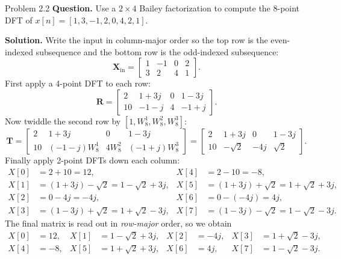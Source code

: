 \documentclass[10pt]{article}
\newcommand{\Prompt}[1]{\textbf{Question.} #1}
\newcommand{\SketchLabel}{\tcblower\textbf{Solution.}}
\begin{document}
\begin{examplebox}{Problem 2.2}
  \Prompt{Use a \(2\times 4\) Bailey factorization to compute the 8-point DFT of \(x[n]=[1,3,-1,2,0,4,2,1]\).}

  \medskip
  \SketchLabel{}
  Write the input in column-major order so the top row is the even-indexed subsequence and the bottom row is the odd-indexed subsequence:
  \[
    \mathbf{X}_{\text{in}}=
    \begin{bmatrix}
      1&-1&0&2\\
      3&2&4&1
    \end{bmatrix}.
  \]
  First apply a 4-point DFT to each row:
  \[
    \mathbf{R}=
    \begin{bmatrix}
      2&1+3j&0&1-3j\\
      10&-1-j&4&-1+j
    \end{bmatrix}.
  \]
  Now twiddle the second row by \([1,W_8^1,W_8^2,W_8^3]\):
  \[
    \mathbf{T}=
    \begin{bmatrix}
      2&1+3j&0&1-3j\\
      10&(-1-j)W_8^1&4W_8^2&(-1+j)W_8^3
    \end{bmatrix}
    =
    \begin{bmatrix}
      2&1+3j&0&1-3j\\
      10&-\sqrt2&-4j&\sqrt2
    \end{bmatrix}.
  \]
  Finally apply 2-point DFTs down each column:
  \[
    \begin{aligned}
      X[0]&=2+10=12, & X[4]&=2-10=-8,\\
      X[1]&=(1+3j)-\sqrt2=1-\sqrt2+3j, & X[5]&=(1+3j)+\sqrt2=1+\sqrt2+3j,\\
      X[2]&=0-4j=-4j, & X[6]&=0-(-4j)=4j,\\
      X[3]&=(1-3j)+\sqrt2=1+\sqrt2-3j, & X[7]&=(1-3j)-\sqrt2=1-\sqrt2-3j.
    \end{aligned}
  \]
  The final matrix is read out in \emph{row-major} order, so we obtain
  \[
    \begin{aligned}
      X[0]&=12,& X[1]&=1-\sqrt2+3j,& X[2]&=-4j,& X[3]&=1+\sqrt2-3j,\\
      X[4]&=-8,& X[5]&=1+\sqrt2+3j,& X[6]&=4j,& X[7]&=1-\sqrt2-3j.
    \end{aligned}
  \]


\end{examplebox}
\end{document}
